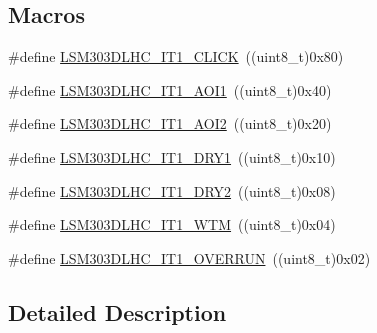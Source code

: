 \subsection*{Macros}
\begin{DoxyCompactItemize}
\item 
\#define \hyperlink{group__Acc__LSM303DLHC__Interrupt1__Configuration__definition_ga6b49bac7c5a0ad63a97fd207869dbdb1}{L\+S\+M303\+D\+L\+H\+C\+\_\+\+I\+T1\+\_\+\+C\+L\+I\+C\+K}~((uint8\+\_\+t)0x80)
\item 
\#define \hyperlink{group__Acc__LSM303DLHC__Interrupt1__Configuration__definition_gaf29fd2731bdb3f41bee0a70d2f37156f}{L\+S\+M303\+D\+L\+H\+C\+\_\+\+I\+T1\+\_\+\+A\+O\+I1}~((uint8\+\_\+t)0x40)
\item 
\#define \hyperlink{group__Acc__LSM303DLHC__Interrupt1__Configuration__definition_ga8ba8565b1f7b4918091320cb141363f2}{L\+S\+M303\+D\+L\+H\+C\+\_\+\+I\+T1\+\_\+\+A\+O\+I2}~((uint8\+\_\+t)0x20)
\item 
\#define \hyperlink{group__Acc__LSM303DLHC__Interrupt1__Configuration__definition_gac269b7d5ef87377fd903c5665cfbea8b}{L\+S\+M303\+D\+L\+H\+C\+\_\+\+I\+T1\+\_\+\+D\+R\+Y1}~((uint8\+\_\+t)0x10)
\item 
\#define \hyperlink{group__Acc__LSM303DLHC__Interrupt1__Configuration__definition_ga70b950391710d0169f44602ad95e2b43}{L\+S\+M303\+D\+L\+H\+C\+\_\+\+I\+T1\+\_\+\+D\+R\+Y2}~((uint8\+\_\+t)0x08)
\item 
\#define \hyperlink{group__Acc__LSM303DLHC__Interrupt1__Configuration__definition_gabfc8a94c21366ee2e8ee6006bdc1fcc0}{L\+S\+M303\+D\+L\+H\+C\+\_\+\+I\+T1\+\_\+\+W\+T\+M}~((uint8\+\_\+t)0x04)
\item 
\#define \hyperlink{group__Acc__LSM303DLHC__Interrupt1__Configuration__definition_ga7aa50e8cda579b2ce17e17a813058486}{L\+S\+M303\+D\+L\+H\+C\+\_\+\+I\+T1\+\_\+\+O\+V\+E\+R\+R\+U\+N}~((uint8\+\_\+t)0x02)
\end{DoxyCompactItemize}


\subsection{Detailed Description}


